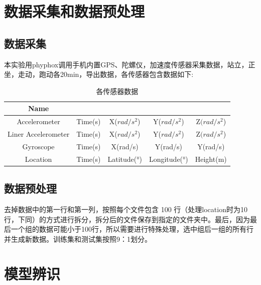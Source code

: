 \documentclass[UTF8]{ctexart}
\begin{document}
\section{数据采集和数据预处理}
\subsection{数据采集}
本实验用phyphox调用手机内置GPS、陀螺仪，加速度传感器采集数据，站立，正坐，走动，跑动各20min，导出数据，各传感器包含数据如下:

\begin{table}[H]
    \centering
    \caption{各传感器数据}
    \begin{tabular}{ccccc}
    \hline
    Name\\  %
    \hline
    Accelerometer   & Time(s) & X($rad/s^2$)  & Y($rad/s^2$)  & Z$(rad/s^2$) \\ 
    Liner Accelerometer   & Time(s) & X($rad/s^2$)  & Y($rad/s^2$)  & Z$(rad/s^2$) \\  
    Gyroscope  & Time(s) & X(rad/s)  & Y(rad/s)  & Y(rad/s) \\  
    Location & Time(s) & Latitude(°)  & Longitude(°) & Height(m)\\
    \hline
    \end{tabular}
\end{table}

\subsection{数据预处理}
去掉数据中的第一行和第一列，按照每个文件包含 100 行（处理location时为10行，下同）的方式进行拆分，拆分后的文件保存到指定的文件夹中。最后，因为最后一个组的数据可能小于100行，所以需要进行特殊处理，选中组后一组的所有行并生成新数据。训练集和测试集按照9：1划分。


\section{模型辨识}
\end{document}
